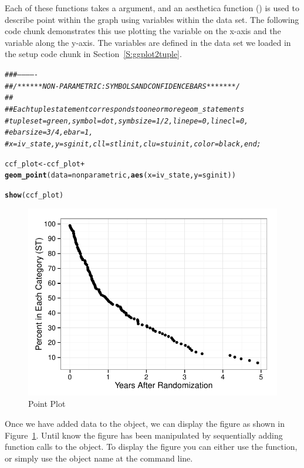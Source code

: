 \documentclass[nojss]{jss}\usepackage[]{graphicx}\usepackage[]{color}
\makeatletter
\def\maxwidth{ %
  \ifdim\Gin@nat@width>\linewidth
    \linewidth
  \else
    \Gin@nat@width
  \fi
}
\newcommand{\hlcom}[1]{\textcolor[rgb]{0.678,0.584,0.686}{\textit{#1}}}%
\newcommand{\hlopt}[1]{\textcolor[rgb]{0,0,0}{#1}}%
\newcommand{\hlstd}[1]{\textcolor[rgb]{0.345,0.345,0.345}{#1}}%
\newcommand{\hlkwb}[1]{\textcolor[rgb]{0.69,0.353,0.396}{#1}}%
\newcommand{\hlkwc}[1]{\textcolor[rgb]{0.333,0.667,0.333}{#1}}%
\newcommand{\hlkwd}[1]{\textcolor[rgb]{0.737,0.353,0.396}{\textbf{#1}}}%
\newenvironment{kframe}{%
 \def\at@end@of@kframe{}%
 \ifinner\ifhmode%
  \def\at@end@of@kframe{\end{minipage}}%
  \begin{minipage}{\columnwidth}%
 \fi\fi%
 \def\FrameCommand##1{\hskip\@totalleftmargin \hskip-\fboxsep
 \colorbox{shadecolor}{##1}\hskip-\fboxsep
     \hskip-\linewidth \hskip-\@totalleftmargin \hskip\columnwidth}%
 \MakeFramed {\advance\hsize-\width
   \@totalleftmargin\z@ \linewidth\hsize
   \@setminipage}}%
 {\par\unskip\endMakeFramed%
 \at@end@of@kframe}
\newenvironment{knitrout}{}{} %
\makeatother
\begin{document}
Each of these functions takes a  argument, and an aesthetica function () is used to describe point within the graph using variables within the data set. The following code chunk demonstrates this use plotting the  variable on the x-axis and the  variable along the y-axis. The variables are defined in the  data set we loaded in the setup code chunk in Section~\ref{S:ggplot2tuple}.
\begin{knitrout}\footnotesize
{}\color{fgcolor}\begin{kframe}
\begin{alltt}
\hlcom{###-------------}
\hlcom{## /******NON-PARAMETRIC: SYMBOLS AND CONFIDENCE BARS *******/}
\hlcom{##}
\hlcom{## Each tuple statement corresponds to one or more geom_ statements}
\hlcom{#     tuple set=green, symbol=dot, symbsize=1/2, linepe=0, linecl=0,}
\hlcom{#       ebarsize=3/4, ebar=1,}
\hlcom{#       x=iv_state, y=sginit, cll=stlinit, clu=stuinit, color=black, end;}

\hlstd{ccf_plot} \hlkwb{<-} \hlstd{ccf_plot} \hlopt{+}
  \hlkwd{geom_point}\hlstd{(}\hlkwc{data}\hlstd{=nonparametric,} \hlkwd{aes}\hlstd{(}\hlkwc{x}\hlstd{=iv_state,} \hlkwc{y}\hlstd{=sginit))}

\hlkwd{show}\hlstd{(ccf_plot)}
\end{alltt}
\end{kframe}\begin{figure}[htpb]


{\centering \includegraphics[width=\maxwidth]{figure/beamer-points} 

}

\caption[Point Plot]{Point Plot\label{F:points}}
\end{figure}


\end{knitrout}
Once we have added data to the  object, we can display the figure as shown in Figure~\ref{F:points}. Until know the figure has been manipulated by sequentially adding function calls to the  object. To display the figure you can either use the  function, or simply use the object name at the command line.
\end{document}
